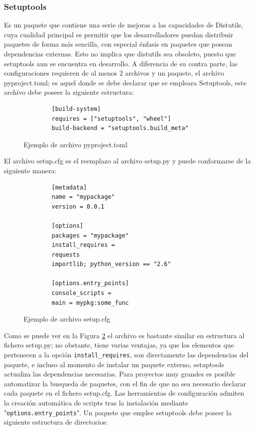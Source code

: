 \subsubsection{Setuptools}
Es un paquete que contiene una serie de mejoras a las capacidades de Distutils, cuya cualidad principal es permitir que los desarrolladores puedan distribuir paquetes de forma más sencilla, con especial énfasis en paquetes que posean dependencias externas. Esto no implica que distutils sea obsoleto, puesto que setuptools aun se encuentra en desarrollo. A diferencia de su contra parte, las configuraciones requieren de al menos 2 archivos y un paquete, el archivo pyproject.toml; es aquel donde se debe declarar que se empleara Setuptools, este archivo debe poseer la siguiente estructura:
\begin{figure}[H]
    \centering
    \begin{verbatim}
		[build-system]
        requires = ["setuptools", "wheel"]
        build-backend = "setuptools.build_meta"
	\end{verbatim}
    \caption{Ejemplo de archivo pyproject.toml}
    \label{pyproject.toml}
\end{figure}
El archivo setup.cfg es el reemplazo al archivo setup.py y puede conformarse de la siguiente manera:
\begin{figure}[H]
    \centering
    \begin{verbatim}
		[metadata]
        name = "mypackage"
        version = 0.0.1

        [options]
        packages = "mypackage"
        install_requires =
        requests
        importlib; python_version == "2.6"
        
        [options.entry_points]
        console_scripts =
        main = mypkg:some_func
	\end{verbatim}
    \caption{Ejemplo de archivo setup.cfg}
    \label{setup.cfg}
\end{figure}
Como se puede ver en la Figura \ref{setup.cfg} el archivo es bastante similar en estructura al fichero setup.py; no obstante, tiene varias ventajas, ya que los elementos que pertenecen a la opción \texttt{install_requires}, son directamente las dependencias del paquete, e incluso al momento de instalar un paquete externo, setuptools actualiza las dependencias necesarias. Para proyectos muy grandes es posible automatizar la busqueda de paquetes, con el fin de que no sea necesario declarar cada paquete en el fichero setup.cfg. 
Las herramientas de configuración admiten la creación automática de scripts tras la instalación mediante "\texttt{options.entry_points}". Un paquete que emplee setuptools debe poseer la siguiente estructura de directorios:

